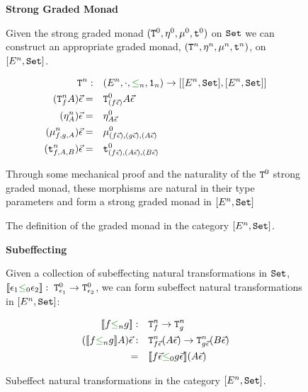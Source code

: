 \begin{figure}
    \begin{framed}
        \centering\textbf{Strong Graded Monad}

Given the strong graded monad $(\texttt{T}^0_{}, \eta_{}^0, \mu^0, \texttt{t}^0)$ on $\texttt{Set}$ we can construct an appropriate graded monad, $(\texttt{T}^n_{}, \eta_{}^n{}{}, \mu^n,\texttt{t}^n)$, on $[E^n, \texttt{Set}]$.

\begin{align*}
    \Tn{}{}:&\quad(E^n, \dot, \subeffect_n, \1_n) \rightarrow [[E^n, \set], [E^n, \set]]\\
    (\Tn{f}{A})\ev=&\quad \Tz{(f\ev)}{A\ev}\\
    (\pointn{A})\ev=&\quad\pointz{A\ev}\\
    (\bindn{f}{g}{A})\ev=&\quad\bindz{(f\ev)}{(g\ev)}{(A\ev)}\\
    (\tstrengthn{f}{A}{B})\ev=&\quad\tstrengthz{(f\ev)}{(A\ev)}{(B\ev)}
\end{align*}

Through some mechanical proof and the naturality of the $\texttt{T}^0_{}$ strong graded monad, these morphisms are natural in their type parameters and form a strong graded monad in $[E^n, \texttt{Set}]$

    \end{framed}
    \caption{The definition of the graded monad in the category $[E^n, \texttt{Set}]$.}
    \label{HowToBuildMonad}
\end{figure}


\begin{figure}
    \begin{framed}
        
        \centering\textbf{Subeffecting}


        Given a collection of subeffecting natural transformations in $\texttt{Set}$, $\deno{\e_1\subeffectz \e_2}:\s \Tz{\e_1}{} \rightarrow \Tz{\e_2}{}$, we can form subeffect natural transformations in $[E^n, \texttt{Set}]$:
        
        \begin{align*}
            \deno{f\subeffectn g}:&\quad\Tn{f}{}\rightarrow \Tn{g}{}\\
            (\deno{f\subeffectn g} A) \ev:&\quad\Tn{f\ev}{(A\ev)}\rightarrow \Tn{g\ev}{(B\ev)}\\
            =&\quad \deno{f\ev\subeffectz g\ev}(A\ev)
        \end{align*}
    \end{framed}
    \caption{Subeffect natural transformations in the category $[E^n, \texttt{Set}]$.}
    \label{HowToBuildSubeffecting}
\end{figure}

